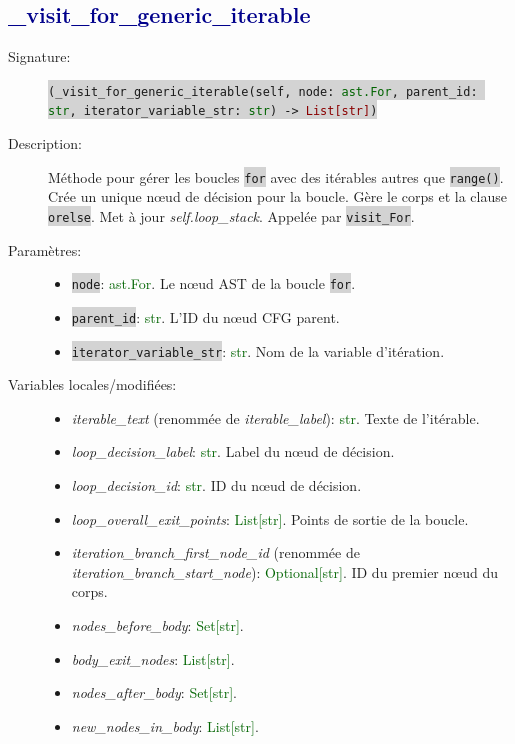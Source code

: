 \documentclass[11pt,a4paper]{article}
\newcommand{\code}[1]{\colorbox{lightgray}{\texttt{\small #1}}}
\newcommand{\var}[1]{\textit{#1}}
\newcommand{\vartype}[1]{\textcolor{darkgreen}{#1}}
\newcommand{\methodname}[1]{\textbf{\textcolor{darkblue}{#1}}}
\newcommand{\param}[1]{\code{#1}}
\newcommand{\rettype}[1]{\textcolor{darkred}{#1}}
\begin{document}
\subsection*{\methodname{\_visit\_for\_generic\_iterable}}
\begin{description}
    \item[Signature:] \code{(\_visit\_for\_generic\_iterable(self, node: \vartype{ast.For}, parent\_id: \vartype{str}, iterator\_variable\_str: \vartype{str}) -> \rettype{List[str]})}
    \item[Description:] Méthode pour gérer les boucles \code{for} avec des itérables autres que \code{range()}. Crée un unique nœud de décision pour la boucle. Gère le corps et la clause \code{orelse}. Met à jour \var{self.loop\_stack}. Appelée par \code{visit\_For}.
    \item[Paramètres:]
    \begin{itemize}
        \item \param{node}: \vartype{ast.For}. Le nœud AST de la boucle \code{for}.
        \item \param{parent\_id}: \vartype{str}. L'ID du nœud CFG parent.
        \item \param{iterator\_variable\_str}: \vartype{str}. Nom de la variable d'itération.
    \end{itemize}
    \item[Variables locales/modifiées:]
    \begin{itemize}
        \item \var{iterable\_text} (renommée de \var{iterable\_label}): \vartype{str}. Texte de l'itérable.
        \item \var{loop\_decision\_label}: \vartype{str}. Label du nœud de décision.
        \item \var{loop\_decision\_id}: \vartype{str}. ID du nœud de décision.
        \item \var{loop\_overall\_exit\_points}: \vartype{List[str]}. Points de sortie de la boucle.
        \item \var{iteration\_branch\_first\_node\_id} (renommée de \var{iteration\_branch\_start\_node}): \vartype{Optional[str]}. ID du premier nœud du corps.
        \item \var{nodes\_before\_body}: \vartype{Set[str]}.
        \item \var{body\_exit\_nodes}: \vartype{List[str]}.
        \item \var{nodes\_after\_body}: \vartype{Set[str]}.
        \item \var{new\_nodes\_in\_body}: \vartype{List[str]}.

\end{itemize}
\end{description}
\end{document}
